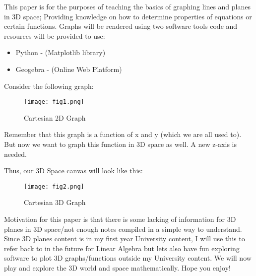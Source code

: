 This paper is for the purposes of teaching the basics of graphing lines and planes in 3D space; Providing knowledge on how to determine properties of equations or certain functions. Graphs will be rendered using two software tools code and resources will be provided to use:
\begin{itemize}
\item{Python - (Matplotlib library)}
\item{Geogebra - (Online Web Platform)}
\end{itemize}

Consider the following graph:
\begin{figure}[htb]
\centering
\texttt{[image: fig1.png]}
\caption{Cartesian 2D Graph}
\label{fig:line}
\end{figure}

Remember that this graph is a function of x and y (which we are all used to). But now we want to graph this function in 3D space as well. A new z-axis is needed.

Thus, our 3D Space canvas will look like this:
\begin{figure}[htb]
\centering
\texttt{[image: fig2.png]}
\caption{Cartesian 3D Graph}
\label{fig:line3d}
\end{figure}

Motivation for this paper is that there is some lacking of information for 3D planes in 3D space/not enough notes compiled in a simple way to understand. Since 3D planes content is in my first year University content, I will use this to refer back to in the future for Linear Algebra but lets also have fun exploring software to plot 3D graphs/functions outside my University content.
We will now play and explore the 3D world and space mathematically. Hope you enjoy!
